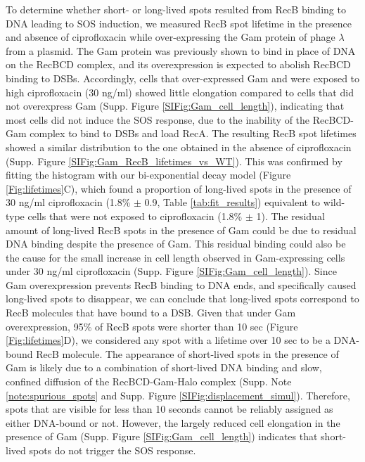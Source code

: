 To determine whether short- or long-lived spots resulted from RecB binding to DNA leading to SOS induction, we measured RecB spot lifetime in the presence and absence of ciprofloxacin while over-expressing the Gam protein of phage $\lambda$ from a plasmid. The Gam protein was previously shown to bind in place of DNA on the RecBCD complex\cite{Wilkinson2016}, and its overexpression is expected to abolish RecBCD binding to DSBs. Accordingly, cells that over-expressed Gam and were exposed to high ciprofloxacin (30 ng/ml) showed little elongation compared to cells that did not overexpress Gam (Supp. Figure \ref{SIFig:Gam_cell_length}), indicating that most cells did not induce the SOS response, due to the inability of the RecBCD-Gam complex to bind to DSBs and load RecA. The resulting RecB spot lifetimes showed a similar distribution to the one obtained in the absence of ciprofloxacin (Supp. Figure \ref{SIFig:Gam_RecB_lifetimes_vs_WT}). This was confirmed by fitting the histogram with our bi-exponential decay model (Figure \ref{Fig:lifetimes}C), which found a proportion of long-lived spots in the presence of 30 ng/ml ciprofloxacin (1.8\% $\pm$ 0.9, Table \ref{tab:fit_results}) equivalent to wild-type cells that were not exposed to ciprofloxacin (1.8\% $\pm$ 1). The residual amount of long-lived RecB spots in the presence of Gam could be due to residual DNA binding despite the presence of Gam. This residual binding could also be the cause for the small increase in cell length observed in Gam-expressing cells under 30 ng/ml ciprofloxacin (Supp. Figure \ref{SIFig:Gam_cell_length}). Since Gam overexpression prevents RecB binding to DNA ends, and specifically caused long-lived spots to disappear, we can conclude that long-lived spots correspond to RecB molecules that have bound to a DSB. Given that under Gam overexpression, 95\% of RecB spots were shorter than 10 sec (Figure \ref{Fig:lifetimes}D), we considered any spot with a lifetime over 10 sec to be a DNA-bound RecB molecule. The appearance of short-lived spots in the presence of Gam is likely due to a combination of short-lived DNA binding and slow, confined diffusion of the RecBCD-Gam-Halo complex (Supp. Note \ref{note:spurious_spots} and Supp. Figure \ref{SIFig:displacement_simul}). Therefore, spots that are visible for less than 10 seconds cannot be reliably assigned as either DNA-bound or not. However, the largely reduced cell elongation in the presence of Gam (Supp. Figure \ref{SIFig:Gam_cell_length}) indicates that short-lived spots do not trigger the SOS response.

